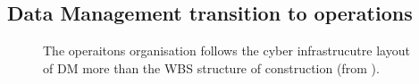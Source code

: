 \subsection{ Data Management transition to operations} \label{sec:trans}

\begin{figure}
\caption{ The operaitons organisation follows the cyber infrastrucutre layout of DM more than the WBS structure of construction (from \cite{RTN-046}).  \label{fig:opsorg}}
\end{figure}

